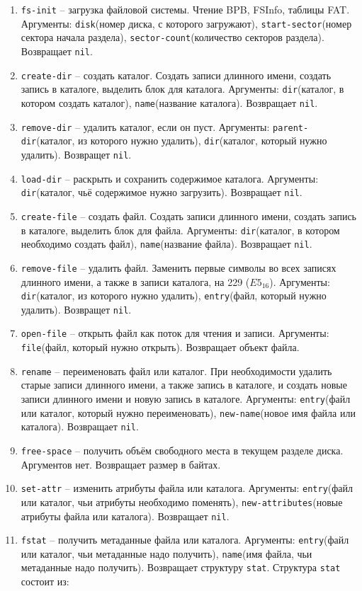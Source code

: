 \begin{enumerate}
	\begin{enumerate}
	\item \texttt{fs-init} -- загрузка файловой системы. Чтение BPB, FSInfo, таблицы FAT. Аргументы: \texttt{disk}(номер диска, с которого загружают), \texttt{start-sector}(номер сектора начала раздела), \texttt{sector-count}(количество секторов раздела). Возвращает \texttt{nil}.
	\item \texttt{create-dir} -- создать каталог. Создать записи длинного имени, создать запись в каталоге, выделить блок для каталога. Аргументы: \texttt{dir}(каталог, в котором создать каталог), \texttt{name}(название каталога). Возвращает \texttt{nil}.
	\item \texttt{remove-dir} -- удалить каталог, если он пуст. Аргументы: \texttt{parent-dir}(каталог, из которого нужно удалить), \texttt{dir}(каталог, который нужно удалить). Возвращет \texttt{nil}.
	\item \texttt{load-dir} -- раскрыть и сохранить содержимое каталога. Аргументы: \texttt{dir}(каталог, чьё содержимое нужно загрузить). Возвращает \texttt{nil}.
	\item \texttt{create-file} -- создать файл. Создать записи длинного имени, создать запись в каталоге, выделить блок для файла. Аргументы: \texttt{dir}(каталог, в котором необходимо создать файл), \texttt{name}(название файла). Возвращает \texttt{nil}.
	\item \texttt{remove-file} -- удалить файл. Заменить первые символы во всех записях длинного имени, а также в записи каталога, на 229 ($E5_{16}$). Аргументы: \texttt{dir}(каталог, из которого нужно удалить), \texttt{entry}(файл, который нужно удалить). Возвращет \texttt{nil}.
	\item \texttt{open-file} -- открыть файл как поток для чтения и записи. Аргументы: \texttt{file}(файл, который нужно открыть). Возвращает объект файла.
	\item \texttt{rename} -- переименовать файл или каталог. При необходимости удалить старые записи длинного имени, а также запись в каталоге, и создать новые записи длинного имени и новую запись в каталоге. Аргументы: \texttt{entry}(файл или каталог, который нужно переименовать), \texttt{new-name}(новое имя файла или каталога). Возвращает \texttt{nil}.
	\item \texttt{free-space} -- получить объём свободного места в текущем разделе диска. Аргументов нет. Возвращает размер в байтах.
	\item \texttt{set-attr} -- изменить атрибуты файла или каталога. Аргументы: \texttt{entry}(файл или каталог, чьи атрибуты необходимо поменять), \texttt{new-attributes}(новые атрибуты файла или каталога). Возвращает \texttt{nil}.
	\item \texttt{fstat} -- получить метаданные файла или каталога. Аргументы: \texttt{entry}(файл или каталог, чьи метаданные надо получить), \texttt{name}(имя файла, чьи метаданные надо получить). Возвращает структуру \texttt{stat}. Структура \texttt{stat} состоит из:
	

\end{enumerate}
\end{enumerate}
